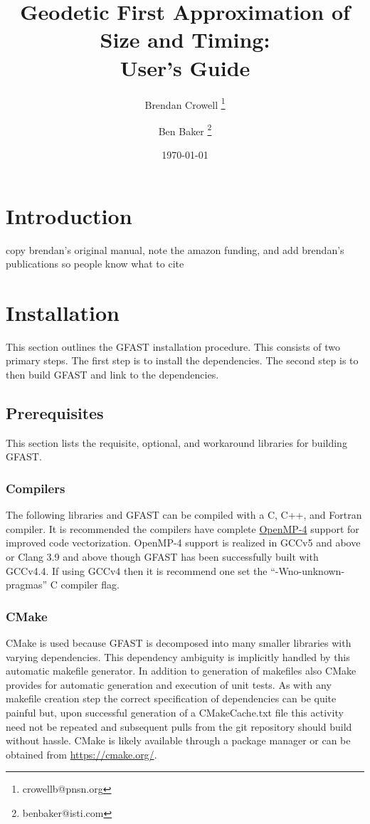 \documentclass[12pt]{article}
\title{
Geodetic First Approximation of Size and Timing: \\ User's Guide
}
\author[1]{Brendan Crowell \thanks{crowellb@pnsn.org}}
\author[2]{Ben Baker \thanks{benbaker@isti.com}}
\affil[1]{Pacific Northwest Seismic Network}
\affil[2]{Instrumental Software Technologies, Inc.}
\date{\today}
\begin{document}
\maketitle
\tableofcontents

\clearpage
\section{Introduction}
copy brendan's original manual, note the amazon funding, and add brendan's publications
so people know what to cite  

\clearpage
\section{Installation}
This section outlines the GFAST installation procedure.  This consists of two primary steps.
The first step is to install the dependencies.  The second step is to then build GFAST and
link to the dependencies.    

\subsection{Prerequisites}
This section lists the requisite, optional, and workaround libraries for building GFAST.   

\subsubsection{Compilers} 
The following libraries and GFAST can be compiled with a 
C, C++, and Fortran compiler.  It is recommended the compilers have complete 
\href{http://openmp.org/wp/}{OpenMP-4} support for improved code vectorization.  
OpenMP-4 support is realized in GCCv5 and above or Clang 3.9 and above though GFAST has
been successfully built with GCCv4.4.  If using GCCv4 then it is
recommend one set the ``-Wno-unknown-pragmas'' C compiler flag.

\subsubsection{CMake} CMake is used because GFAST is decomposed into many smaller libraries with 
varying dependencies.  This dependency ambiguity is implicitly handled by this automatic 
makefile generator. In addition to generation of makefiles also CMake provides for automatic generation
and execution of unit tests. As with any makefile creation step the correct 
specification of dependencies can be quite painful but, upon successful generation of a
CMakeCache.txt file this activity need not be repeated and subsequent pulls from the git
repository should build without hassle.  CMake is likely available through a package manager
or can be obtained from \url{https://cmake.org/}. 
\end{document}
